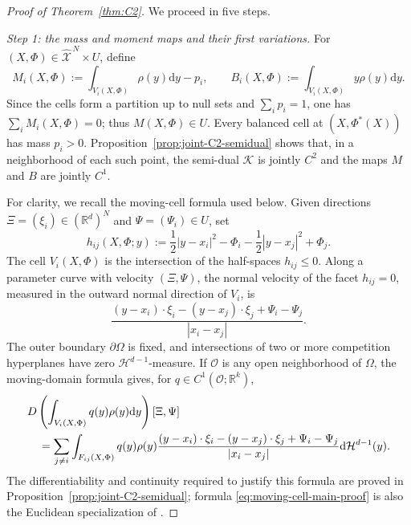 \documentclass[11pt]{article}
\def\R{\mathbb{R}}
\def\Oc{{\mathcal O}}
\def\Xc{{\mathcal X}}
\def\hX{\widehat{\Xc}^{\,N}}
\newcommand{\dd}{\mathrm{d}}
\newcommand{\HH}{\mathcal H}
\newcommand{\Kant}{\mathscr K}
\theoremstyle{definition}
\theoremstyle{remark}
\numberwithin{equation}{section}
\begin{document}
\begin{proof}[Proof of Theorem~\ref{thm:C2}]
We proceed in five steps.

\medskip
\noindent\textit{Step 1: the mass and moment maps and their first variations.}
For $(X,\Phi)\in\hX\times U$, define
\begin{equation}\label{eq:mass-moment-main}
 M_i(X,\Phi):=\int_{V_i(X,\Phi)}\rho(y)\dd y-p_i,
 \qquad
 B_i(X,\Phi):=\int_{V_i(X,\Phi)}y\rho(y)\dd y.
\end{equation}
Since the cells form a partition up to null sets and $\sum_i p_i=1$, one has
$\sum_iM_i(X,\Phi)=0$; thus $M(X,\Phi)\in U$.  Every balanced cell at
$(X,\Phi^*(X))$ has mass $p_i>0$.  Proposition~\ref{prop:joint-C2-semidual} shows that, in a
neighborhood of each such point, the semi-dual $\Kant$ is jointly $C^2$ and the maps $M$ and $B$
are jointly $C^1$.

For clarity, we recall the moving-cell formula used below.  Given directions
$\Xi=(\xi_i)\in(\R^d)^N$ and $\Psi=(\Psi_i)\in U$, set
\[
 h_{ij}(X,\Phi;y)
 :=\frac12|y-x_i|^2-\Phi_i-\frac12|y-x_j|^2+\Phi_j.
\]
The cell $V_i(X,\Phi)$ is the intersection of the half-spaces $h_{ij}\le0$.  Along a parameter
curve with velocity $(\Xi,\Psi)$, the normal velocity of the facet $h_{ij}=0$, measured in the
outward normal direction of $V_i$, is
\begin{equation}\label{eq:normal-velocity-main}
 \frac{(y-x_i)\cdot\xi_i-(y-x_j)\cdot\xi_j+\Psi_i-\Psi_j}
 {|x_i-x_j|}.
\end{equation}
The outer boundary $\partial\Omega$ is fixed, and intersections of two or more competition
hyperplanes have zero $\HH^{d-1}$-measure.  If $\Oc$ is any open neighborhood of $\Omega$, the moving-domain formula gives, for
$q\in C^1(\Oc;\R^k)$,
\begin{align}
 &D\left(\int_{V_i(X,\Phi)}q(y)\rho(y)\dd y\right)[\Xi,\Psi]\notag\\
 &\quad=\sum_{j\ne i}\int_{F_{ij}(X,\Phi)}q(y)\rho(y)
 \frac{(y-x_i)\cdot\xi_i-(y-x_j)\cdot\xi_j+\Psi_i-\Psi_j}
 {|x_i-x_j|}\dd\HH^{d-1}(y).
 \label{eq:moving-cell-main-proof}
\end{align}
The differentiability and continuity required to justify this formula are proved in
Proposition~\ref{prop:joint-C2-semidual}; formula
\eqref{eq:moving-cell-main-proof} is also the Euclidean specialization of
\cite[Theorem~1 and Proposition~1.1]{deGournayKahnLebrat2019}.


\end{proof}
\end{document}
